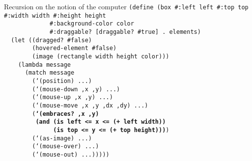 \begin{frame}{Recursion on the notion of the computer}
  \tiny
  \texttt{(define (box \#:left left \#:top top \#:width width \#:height height\\
    \ \ \ \ \ \ \ \ \ \ \ \ \ \#:background-color color\\
    \ \ \ \ \ \ \ \ \ \ \ \ \ \#:draggable? [draggable? \#true] . elements)\\
    \ \ (let ((dragged? \#false)\\
    \ \ \ \ \ \ \ \ (hovered-element \#false)\\
    \ \ \ \ \ \ \ \ (image (rectangle width height color)))\\
    \ \ \ \ (lambda message\\
    \ \ \ \ \ \ (match message\\
    \ \ \ \ \ \ \ \ (`(position) ...)\\
    \ \ \ \ \ \ \ \ (`(mouse-down ,x ,y) ...)\\
    \ \ \ \ \ \ \ \ (`(mouse-up ,x ,y) ...)\\
    \ \ \ \ \ \ \ \ (`(mouse-move ,x ,y ,dx ,dy) ...)\\
    \ \ \ \ \ \ \ \ (\textbf{`(embraces? ,x ,y)\\
      \ \ \ \ \ \ \ \ \ (and (is left <= x <= (+ left width))\\
      \ \ \ \ \ \ \ \ \ \ \ \ \ \ (is top <= y <= (+ top height)))})\\
    \ \ \ \ \ \ \ \ (`(as-image) ...)\\
    \ \ \ \ \ \ \ \ (`(mouse-over) ...)\\
    \ \ \ \ \ \ \ \ (`(mouse-out) ...)))))\\
    \ \\
    \ \\
    \ \\
    \ \\
    \ \\
    \ \\
    \ \\
    \ \\
    \ \\
    \ 
    }
\end{frame}

